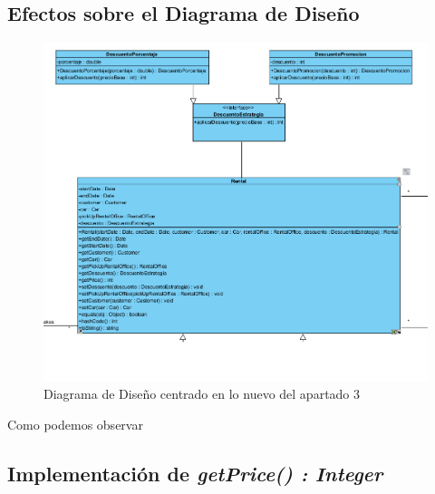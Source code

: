 \subsection{Efectos sobre el Diagrama de Diseño}

\begin{figure}[H]
    \centering
     \includegraphics[width=1\linewidth]{assets/diagramas/UML_Apartado3.png}
     \caption{Diagrama de Diseño centrado en lo nuevo del apartado 3}
\end{figure}

Como podemos observar 

\subsection{Implementación de \textit{getPrice() : Integer}}

\newpage
